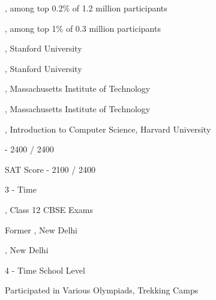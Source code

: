 \documentclass[]{deedy-resume-openfont}
\begin{document}
\vspace{\topsep} %
\vspace{\topsep} %
\begin{large}
\begin{tightemize}
\item {}, among top 0.2\% of 1.2 million participants
\item {}, among top 1\% of 0.3 million participants
\item {}, Stanford University
\item {}, Stanford University
\item {}, Massachusetts Institute of Technology
\item {}, Massachusetts Institute of Technology
\item {}, Introduction to Computer Science, Harvard University
\item {} - 2400 / 2400
\item SAT Score - 2100 / 2400
\item 3 - Time 
\item {}, Class 12 CBSE Exams
\end{tightemize}
\end{large}
\vspace{\topsep} %


\vspace{\topsep} %
\begin{large}
\begin{tightemize}
\item Former , New Delhi
\item {}, New Delhi
\item 4 - Time School Level 
\item Participated in Various Olympiads, Trekking Camps
\end{tightemize}
\end{large}
\end{document}
